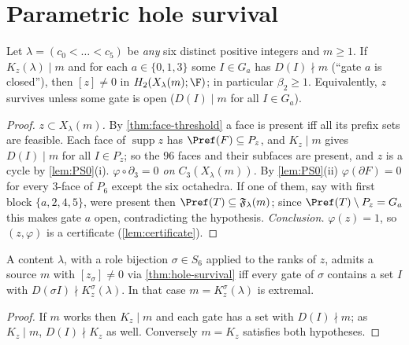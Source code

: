 \section{Parametric hole survival}
\begin{theorem}\label{thm:hole-survival}
Let $\lambda=(c_0<\dots<c_5)$ be \emph{any} six distinct positive integers and $m\ge1$. If $K_z(\lambda)\mid m$ and for each $a\in\{0,1,3\}$ some $I\in G_a$ has $D(I)\nmid m$ (``gate $a$ is closed''), then $[z]\neq0$ in $H_2(X_\lambda(m);\F)$; in particular $\beta_2\ge1$. Equivalently, $z$ survives unless some gate is open ($D(I)\mid m$ for all $I\in G_a$).
\end{theorem}
\begin{proof}
\emph{$z\subset X_\lambda(m)$.} By \cref{thm:face-threshold} a face is present iff all its prefix sets are feasible. Each face of $\operatorname{supp}z$ has $\Pref(F)\subseteq P_z$, and $K_z\mid m$ gives $D(I)\mid m$ for all $I\in P_z$; so the $96$ faces and their subfaces are present, and $z$ is a cycle by \cref{lem:PS0}(i).
\emph{$\varphi\circ\partial_3=0$ on $C_3(X_\lambda(m))$.} By \cref{lem:PS0}(ii) $\varphi(\partial F)=0$ for every $3$-face of $P_6$ except the six octahedra. If one of them, say with first block $\{a,2,4,5\}$, were present then $\Pref(T)\subseteq\mathfrak F_\lambda(m)$; since $\Pref(T)\setminus P_z=G_a$ this makes gate $a$ open, contradicting the hypothesis.
\emph{Conclusion.} $\varphi(z)=1$, so $(z,\varphi)$ is a certificate (\cref{lem:certificate}).
\end{proof}
\begin{proposition}\label{prop:existence-survival}
A content $\lambda$, with a role bijection $\sigma\in S_6$ applied to the ranks of $z$, admits a source $m$ with $[z_\sigma]\ne0$ via \cref{thm:hole-survival} iff every gate of $\sigma$ contains a set $I$ with $D(\sigma I)\nmid K_z^\sigma(\lambda)$. In that case $m=K_z^\sigma(\lambda)$ is extremal.
\end{proposition}
\begin{proof}
If $m$ works then $K_z\mid m$ and each gate has a set with $D(I)\nmid m$; as $K_z\mid m$, $D(I)\nmid K_z$ as well. Conversely $m=K_z$ satisfies both hypotheses.
\end{proof}
